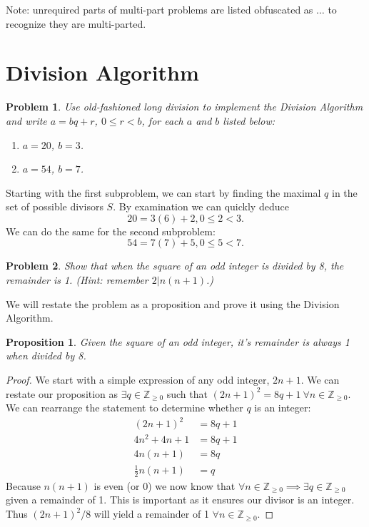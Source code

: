 \documentclass[12pt]{article}
\newtheorem*{prop}{Proposition}
\newtheorem{problem}{Problem}
\theoremstyle{remark}  %
\begin{document}
 
%
\rhead{\today}
Note: unrequired parts of multi-part problems are listed obfuscated as $\dots$ to recognize they are multi-parted.
\section{Division Algorithm}

\setcounter{problem}{4}
    \begin{problem}
        Use old-fashioned long division to implement the Division Algorithm and write $a=bq+r$, $0\leq r<b$, for each $a$ and $b$ listed below:
        \begin{enumerate}[label=(\alph*)]
            \item $a=20$, $b=3$.
            \item $a=54$, $b=7$.
        \end{enumerate}
    \end{problem}
    Starting with the first subproblem, we can start by finding the maximal $q$ in the set of possible divisors $S$. By examination we can quickly deduce $$\boxed{20 = 3(6) + 2, 0 \leq 2 < 3.}$$ We can do the same for the second subproblem: $$\boxed{54 = 7(7) + 5, 0 \leq 5 < 7.}$$
\vspace{.5em}
\setcounter{problem}{7}
    \begin{problem}
        Show that when the square of an odd integer is divided by 8, the remainder is 1. (Hint: remember $2|n(n+1)$.)
    \end{problem}
    We will restate the problem as a proposition and prove it using the Division Algorithm.
    \begin{prop}
        Given the square of an odd integer, it's remainder is always 1 when divided by 8.
    \end{prop}
    \begin{proof}
        We start with a simple expression of any odd integer, $2n+1$. We can restate our proposition as $\exists q \in \mathbb{Z}_{\geq 0}$ such that $(2n+1)^2=8q+1 \ \forall n\in\mathbb{Z}_{\geq 0}$. We can rearrange the statement to determine whether $q$ is an integer:
        \begin{align*}
            (2n+1)^2 &= 8q+1 \\
            4n^2+4n+1 &= 8q+1 \\
            4n(n+1) &= 8q \\
            \frac{1}{2}n(n+1) &= q
        \end{align*}
        Because $n(n+1)$ is even (or 0) we now know that $\forall n\in \mathbb{Z}_{\geq0} \implies \exists q\in \mathbb{Z}_{\geq0}$ given a remainder of 1. This is important as it ensures our divisor is an integer. Thus $(2n+1)^2/8$ will yield a remainder of 1 $\forall n\in \mathbb{Z}_{\geq0}$.
    \end{proof}
\end{document}
